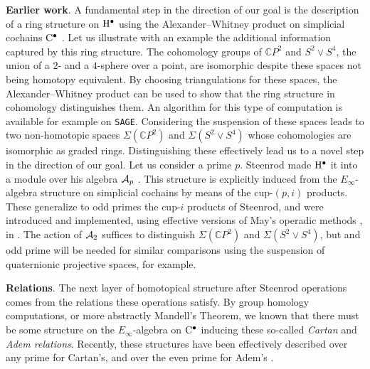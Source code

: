 \medskip\noindent\textbf{Earlier work}.
A fundamental step in the direction of our goal is the description of a ring structure on $\mathrm{H}^\bullet$ using the Alexander--Whitney product on simplicial cochains $\mathrm{C}^\bullet$ \cite{alexander1936ring, whitney1938products}.
Let us illustrate with an example the additional information captured by this ring structure.
The cohomology groups of $\mathbb{C} P^2$ and $S^2 \vee S^4$, the union of a $2$- and a $4$-sphere over a point, are isomorphic despite these spaces not being homotopy equivalent.
By choosing triangulations for these spaces, the Alexander--Whitney product can be used to show that the ring structure in cohomology distinguishes them.
An algorithm for this type of computation is available for example on \texttt{SAGE}.
Considering the suspension of these spaces leads to two non-homotopic spaces $\Sigma(\mathbb{C} P^2)$ and $\Sigma(S^2 \vee S^4)$ whose cohomologies are isomorphic as graded rings.
Distinguishing these effectively lead us to a novel step in the direction of our goal.
Let us consider a prime $p$.
Steenrod made $\mathrm{H}^\bullet$ it into a module over his algebra $\mathcal{A}_p$ \cite{steenrod1962cohomology}.
This structure is explicitly induced from the $E_\infty$-algebra structure on simplicial cochains by means of the cup-$(p,i)$ products.
These generalize to odd primes the cup-$i$ products of Steenrod, and were introduced and implemented, using effective versions of May's operadic methods \cite{may1970general}, in \cite{medina2021may_st,medina2021comch}.
The action of $\mathcal{A}_2$ suffices to distinguish $\Sigma(\mathbb{C} P^2)$ and $\Sigma(S^2 \vee S^4)$, but and odd prime will be needed for similar comparisons using the suspension of quaternionic projective spaces, for example.


\medskip\noindent\textbf{{\sc Relations}}.
The next layer of homotopical structure after Steenrod operations comes from the relations these operations satisfy.
By group homology computations, or more abstractly Mandell's Theorem, we known that there must be some structure on the $E_\infty$-algebra on $\mathrm{C}^\bullet$ inducing these so-called \textit{Cartan} and \textit{Adem relations}.
Recently, these structures have been effectively described over any prime for Cartan's, and over the even prime for Adem's \cite{medina2020cartan,medina2023oddcartan,medina2021adem}.

